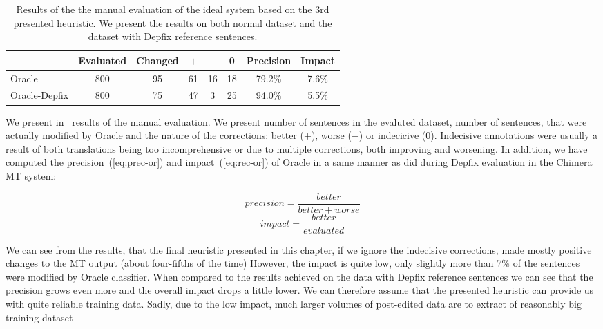 \begin{table*}[t]
\centering
\small

\begin{tabular}{l|cc|ccc|cc}
  &  Evaluated  &  Changed  &  $+$  &  $-$  &  0  &  Precision  &  Impact  \\
\hline
Oracle  &  800  &  95  &  61  &  16  &  18  &  79.2\%  &  7.6\%  \\
Oracle-Depfix  & 800  &  75  &  47  &  3  &  25  &  94.0\%  &  5.5\%  \\
\end{tabular}
\caption{
Results of the the manual evaluation of the ideal system based on the 3rd
presented heuristic. We present the results on both normal dataset and
the
dataset with Depfix reference sentences.
}
\label{oracle-maneval}
\end{table*}

We present in~ results of the manual evaluation.
We present number of sentences in the evaluted dataset, number of sentences,
that were actually modified by Oracle and the nature of the corrections:
better ($+$), worse ($-$) or indecicive (0).
Indecisive annotations were usually a result of both translations being
too incomprehensive or due to multiple corrections, both improving and worsening.
In addition, we have computed the precision~(\ref{eq:prec-or}) and
impact~(\ref{eq:rec-or}) of Oracle in a same manner as \citet{bojar-rosa-tamchyna:2013:WMT} did during Depfix evaluation in the Chimera MT system:

\begin{equation} \label{eq:prec-or}
precision = \frac{better}{better + worse}
\end{equation}
\begin{equation} \label{eq:rec-or}
impact = \frac{better}{evaluated}
\end{equation}

We can see from the results, that the final heuristic presented in this chapter,
if we ignore the indecisive corrections,
made mostly positive changes to the MT output (about four-fifths of the time)
However, the impact is quite low, only slightly more than 7\% of the sentences were modified
by Oracle classifier. When compared to the results achieved on the data with Depfix
reference sentences we can see that the precision grows even more
and the overall impact drops a little lower.
We can therefore assume that the presented heuristic can provide us with
quite reliable training data. Sadly, due to the low impact, much larger
volumes of post-edited data are to extract of reasonably big training dataset

